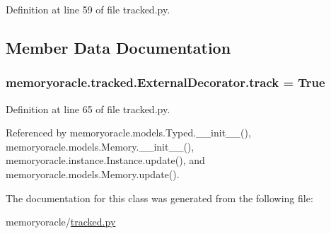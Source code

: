 Definition at line 59 of file tracked.\+py.



\subsection{Member Data Documentation}
\hypertarget{classmemoryoracle_1_1tracked_1_1ExternalDecorator_ab19a351b0611438256f7e65cbde9d301}{}
\subsubsection[{track}]{\setlength{\rightskip}{0pt plus 5cm}memoryoracle.\+tracked.\+External\+Decorator.\+track = True\hspace{0.3cm}{\ttfamily [static]}}\label{classmemoryoracle_1_1tracked_1_1ExternalDecorator_ab19a351b0611438256f7e65cbde9d301}


Definition at line 65 of file tracked.\+py.



Referenced by memoryoracle.\+models.\+Typed.\+\_\+\+\_\+init\+\_\+\+\_\+(), memoryoracle.\+models.\+Memory.\+\_\+\+\_\+init\+\_\+\+\_\+(), memoryoracle.\+instance.\+Instance.\+update(), and memoryoracle.\+models.\+Memory.\+update().



The documentation for this class was generated from the following file\+:\begin{DoxyCompactItemize}
\item 
memoryoracle/\hyperlink{tracked_8py}{tracked.\+py}\end{DoxyCompactItemize}
